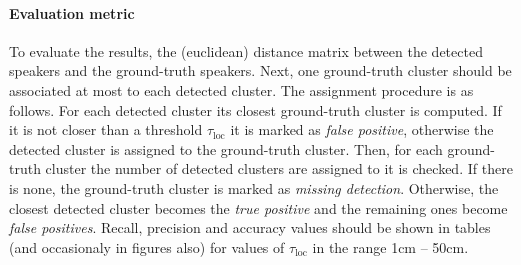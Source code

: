 \documentclass[a4paper]{article}
\begin{document}
\paragraph{Evaluation metric} To evaluate the results, the (euclidean) distance matrix between the detected speakers and
the ground-truth speakers. Next, one ground-truth cluster should be associated at most to each detected cluster. The
assignment procedure is as follows. For each detected cluster its closest ground-truth cluster is computed. If it is
not closer than a threshold $\tau_{\textrm{loc}}$ it is marked as \textit{false positive}, otherwise the detected
cluster is assigned to the ground-truth cluster. Then, for each ground-truth cluster the number of detected
clusters are assigned to it is checked. If there is none, the ground-truth cluster is marked as \textit{missing
detection}. Otherwise, the closest detected cluster becomes the \textit{true positive} and the remaining ones
become \textit{false positives}. Recall, precision and accuracy values should be shown in tables (and occasionaly in
figures also) for values of $\tau_\textrm{loc}$ in the range 1cm -- 50cm.



\end{document}
